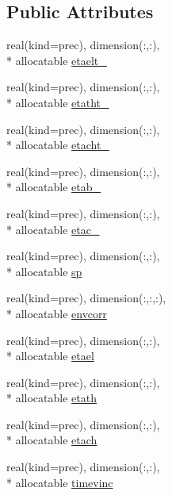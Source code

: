 \subsection*{Public Attributes}
\begin{DoxyCompactItemize}
\item 
real(kind=prec), dimension(\-:,\-:), \\*
allocatable \hyperlink{classplantvar_a42c8e330560c87b991b46be04c40a03d}{etaelt\-\_\-}
\item 
real(kind=prec), dimension(\-:,\-:), \\*
allocatable \hyperlink{classplantvar_a355b18c048762925b750fe247a09c4cd}{etatht\-\_\-}
\item 
real(kind=prec), dimension(\-:,\-:), \\*
allocatable \hyperlink{classplantvar_a1bfe35beb70f107ed930740d7ce7189a}{etacht\-\_\-}
\item 
real(kind=prec), dimension(\-:,\-:), \\*
allocatable \hyperlink{classplantvar_a4307773fae45ef7c05c590189ae40c32}{etab\-\_\-}
\item 
real(kind=prec), dimension(\-:,\-:), \\*
allocatable \hyperlink{classplantvar_ab3e228857f49d79572bc7071e650ae33}{etac\-\_\-}
\item 
real(kind=prec), dimension(\-:,\-:), \\*
allocatable \hyperlink{classplantvar_a0ecfac9070622328232608ce808ede2b}{sp}
\item 
real(kind=prec), dimension(\-:,\-:,\-:), \\*
allocatable \hyperlink{classplantvar_a187eaf8e3b46428daf4b89db350aa0f1}{envcorr}
\item 
real(kind=prec), dimension(\-:,\-:), \\*
allocatable \hyperlink{classplantvar_a1a1a32a309c970c5ccccda52cbc92e36}{etael}
\item 
real(kind=prec), dimension(\-:,\-:), \\*
allocatable \hyperlink{classplantvar_a226f4150db308d7f4c46da8f297127af}{etath}
\item 
real(kind=prec), dimension(\-:,\-:), \\*
allocatable \hyperlink{classplantvar_a1bae392336fb8d7f0376c7e98163003e}{etach}
\item 
real(kind=prec), dimension(\-:,\-:), \\*
allocatable \hyperlink{classplantvar_aade5aa28513690acf2cf215b0dc1acd2}{timevinc}
\item 

\end{DoxyCompactItemize}
